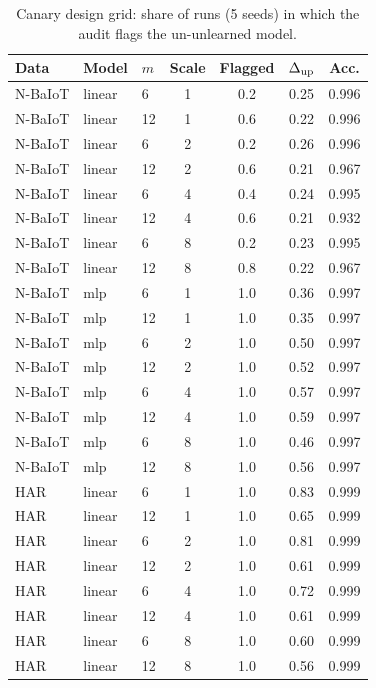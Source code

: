 \begin{table}[h]
\centering
\caption{Canary design grid: share of runs (5 seeds) in which the audit flags the un-unlearned model.}\label{tab:s_power}
\footnotesize
\setlength{\tabcolsep}{3pt}
\begin{tabular}{@{}lllcccc@{}}
\toprule
Data & Model & $m$ & Scale & Flagged & $\Delta_{\rm up}$ & Acc. \\
\midrule
N-BaIoT & linear & 6 & 1 & 0.2 & 0.25 & 0.996 \\
N-BaIoT & linear & 12 & 1 & 0.6 & 0.22 & 0.996 \\
N-BaIoT & linear & 6 & 2 & 0.2 & 0.26 & 0.996 \\
N-BaIoT & linear & 12 & 2 & 0.6 & 0.21 & 0.967 \\
N-BaIoT & linear & 6 & 4 & 0.4 & 0.24 & 0.995 \\
N-BaIoT & linear & 12 & 4 & 0.6 & 0.21 & 0.932 \\
N-BaIoT & linear & 6 & 8 & 0.2 & 0.23 & 0.995 \\
N-BaIoT & linear & 12 & 8 & 0.8 & 0.22 & 0.967 \\
N-BaIoT & mlp & 6 & 1 & 1.0 & 0.36 & 0.997 \\
N-BaIoT & mlp & 12 & 1 & 1.0 & 0.35 & 0.997 \\
N-BaIoT & mlp & 6 & 2 & 1.0 & 0.50 & 0.997 \\
N-BaIoT & mlp & 12 & 2 & 1.0 & 0.52 & 0.997 \\
N-BaIoT & mlp & 6 & 4 & 1.0 & 0.57 & 0.997 \\
N-BaIoT & mlp & 12 & 4 & 1.0 & 0.59 & 0.997 \\
N-BaIoT & mlp & 6 & 8 & 1.0 & 0.46 & 0.997 \\
N-BaIoT & mlp & 12 & 8 & 1.0 & 0.56 & 0.997 \\
HAR & linear & 6 & 1 & 1.0 & 0.83 & 0.999 \\
HAR & linear & 12 & 1 & 1.0 & 0.65 & 0.999 \\
HAR & linear & 6 & 2 & 1.0 & 0.81 & 0.999 \\
HAR & linear & 12 & 2 & 1.0 & 0.61 & 0.999 \\
HAR & linear & 6 & 4 & 1.0 & 0.72 & 0.999 \\
HAR & linear & 12 & 4 & 1.0 & 0.61 & 0.999 \\
HAR & linear & 6 & 8 & 1.0 & 0.60 & 0.999 \\
HAR & linear & 12 & 8 & 1.0 & 0.56 & 0.999 \\
\bottomrule
\end{tabular}
\end{table}


